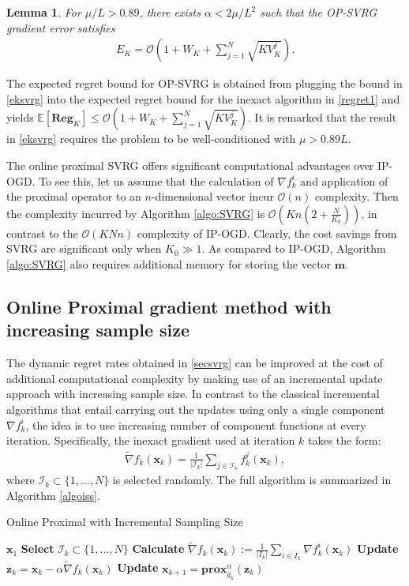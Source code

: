 \documentclass[draftcls,onecolumn,12pt]{IEEEtran}
\theoremstyle{plain}
\newtheorem{lem}{Lemma}
\def\x{\mathbf{x}}
\def\z{\mathbf{z}}
\def\m{\boldsymbol{m}}
\def \nt {\tilde{\nabla}}
\def\I{\mathcal{I}}
\def\prox{\textbf{prox}}
\providecommand{\abs}[1]{\left|#1\right|}
\providecommand{\Ex}[1]{\mathbb{E}\left[#1\right]}
\providecommand{\pk}[1]{\prox_{g_k}^\alpha\!\!\left(#1\right)}
\theoremstyle{plain}
\theoremstyle{remark}
\begin{document}
\begin{lem}\label{lemsvrg}
For $\mu/L > 0.89$, there exists $\alpha < 2\mu/L^2$ such that the OP-SVRG gradient error satisfies
\begin{align}
E_K = \mathcal{O}\left(1+W_K+\sum\limits_{j=1}^{N}\sqrt{KV_K^j}\right). \label{eksvrg}
\end{align}
\end{lem}
The expected regret bound for OP-SVRG is obtained from plugging the bound in \eqref{eksvrg} into the expected regret bound for the inexact algorithm in \eqref{regret1} and yields $\Ex{\mathbf{Reg}_K}\leq \mathcal{O}(1+W_K+\sum\limits_{j=1}^{N}\sqrt{KV_K^j})$. It is remarked that the result in \eqref{eksvrg} requires the problem to be well-conditioned with $\mu > 0.89L$. 



The online proximal SVRG offers significant computational advantages over IP-OGD. To see this, let us assume that the calculation of $\nabla f_k^i$ and application of the proximal operator to an $n$-dimensional vector incur $\mathcal{O}(n)$ complexity. Then the complexity incurred by Algorithm \ref{algo:SVRG} is $\mathcal{O}(Kn(2+\frac{N}{K_0}))$, in contrast to the $\mathcal{O}(KNn)$ complexity of IP-OGD. Clearly, the cost savings from SVRG are significant only when $K_0 \gg 1$. As compared to IP-OGD, Algorithm \ref{algo:SVRG} also requires additional memory for storing the vector $\m$. 

\subsection{Online Proximal gradient method with increasing sample size}
The dynamic regret rates obtained in \ref{secsvrg} can be improved at the cost of additional computational complexity by making use of an incremental update approach with increasing sample size. In contrast to the classical incremental algorithms that entail carrying out the updates using only a single component $\nabla f_k^i$, the idea is to use increasing number of component functions at every iteration. Specifically, the inexact gradient used at iteration $k$ takes the form:
\begin{align}
\nt f_k(\x_k) = \frac{1}{\abs{\I_k}}\sum_{j \in \I_k} f_k^j(\x_k),
\end{align}
where $\I_k \subset \{1, \ldots, N\}$ is selected randomly. The full algorithm is summarized in Algorithm \ref{algoiss}. 
\begin{algorithm}
	  	\caption{Online Proximal with Incremental Sampling Size}\label{algoiss}
	  	\begin{algorithmic}[1]
	  		  $\x_1$	  	
				\STATE \textbf{Select} $\I_k \subset \{1, \ldots, N\}$	
				\STATE \textbf{Calculate} $\nt f_k(\x_k) := \frac{1}{\abs{I_k}}\sum\limits_{i \in I_k}\nabla f_k^i(\x_k) $ 
	  	   \STATE \textbf{Update} $\z_{k} = \x_{k} - \alpha\nt f_k(\x_k)$   		
	  		\STATE \textbf{Update} $\x_{k+1} = \pk{\z_{k}}$
	  		\ENDFOR
	  	\end{algorithmic}
	  \end{algorithm}
  
\end{document}
